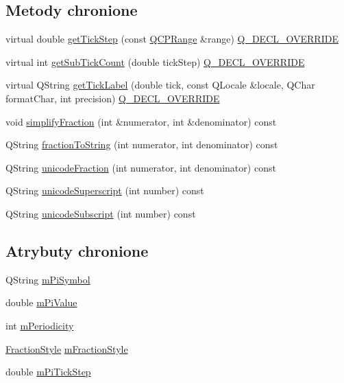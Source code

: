 \subsection*{Metody chronione}
\begin{DoxyCompactItemize}
\item 
virtual double \hyperlink{class_q_c_p_axis_ticker_pi_a55301f0072983bd2d7c131a24e1779e7}{get\+Tick\+Step} (const \hyperlink{class_q_c_p_range}{Q\+C\+P\+Range} \&range) \hyperlink{qcustomplot_8hh_a42cc5eaeb25b85f8b52d2a4b94c56f55}{Q\+\_\+\+D\+E\+C\+L\+\_\+\+O\+V\+E\+R\+R\+I\+DE}
\item 
virtual int \hyperlink{class_q_c_p_axis_ticker_pi_a56c90f870da97c8670cfae4d04ff3ac7}{get\+Sub\+Tick\+Count} (double tick\+Step) \hyperlink{qcustomplot_8hh_a42cc5eaeb25b85f8b52d2a4b94c56f55}{Q\+\_\+\+D\+E\+C\+L\+\_\+\+O\+V\+E\+R\+R\+I\+DE}
\item 
virtual Q\+String \hyperlink{class_q_c_p_axis_ticker_pi_a9a087d931d4344b8a91d5cecceff7109}{get\+Tick\+Label} (double tick, const Q\+Locale \&locale, Q\+Char format\+Char, int precision) \hyperlink{qcustomplot_8hh_a42cc5eaeb25b85f8b52d2a4b94c56f55}{Q\+\_\+\+D\+E\+C\+L\+\_\+\+O\+V\+E\+R\+R\+I\+DE}
\item 
void \hyperlink{class_q_c_p_axis_ticker_pi_a54f04ef1a6d154e0008028b2a00c7442}{simplify\+Fraction} (int \&numerator, int \&denominator) const 
\item 
Q\+String \hyperlink{class_q_c_p_axis_ticker_pi_ac51d1438d383d802d28c387d6d89e5b4}{fraction\+To\+String} (int numerator, int denominator) const 
\item 
Q\+String \hyperlink{class_q_c_p_axis_ticker_pi_a4d9c2f7ba67862646dcbb76956639df7}{unicode\+Fraction} (int numerator, int denominator) const 
\item 
Q\+String \hyperlink{class_q_c_p_axis_ticker_pi_a32593f7ae19b82ca48e838ae74dfe7a6}{unicode\+Superscript} (int number) const 
\item 
Q\+String \hyperlink{class_q_c_p_axis_ticker_pi_af714773472781345bef39a9ab85b691c}{unicode\+Subscript} (int number) const 
\end{DoxyCompactItemize}
\subsection*{Atrybuty chronione}
\begin{DoxyCompactItemize}
\item 
Q\+String \hyperlink{class_q_c_p_axis_ticker_pi_a0962084571116e4d98e4dccc2e68f5ea}{m\+Pi\+Symbol}
\item 
double \hyperlink{class_q_c_p_axis_ticker_pi_ab3e899a3d23ada89eb48b465204b09ea}{m\+Pi\+Value}
\item 
int \hyperlink{class_q_c_p_axis_ticker_pi_af5372570aa91ef3b0586939d91c119db}{m\+Periodicity}
\item 
\hyperlink{class_q_c_p_axis_ticker_pi_a262f1534c7f0c79a7d5237f5d1e2c54c}{Fraction\+Style} \hyperlink{class_q_c_p_axis_ticker_pi_a34db3e41fbc1e91426841ca040930595}{m\+Fraction\+Style}
\item 
double \hyperlink{class_q_c_p_axis_ticker_pi_a943706b7796d778c62915498864bbeb8}{m\+Pi\+Tick\+Step}
\end{DoxyCompactItemize}


